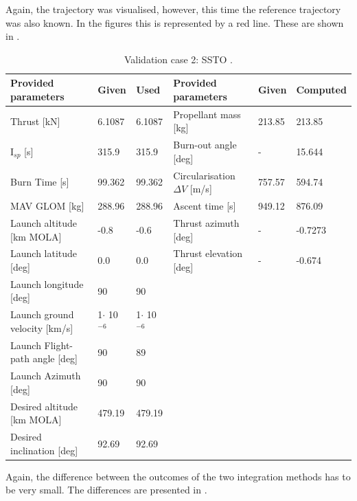 \noindent
Again, the trajectory was visualised, however, this time the reference trajectory was also known. In the figures this is represented by a red line. These are shown in .



\begin{table}[H]
\begin{center}
\caption{Validation case 2: \ac{SSTO} \cite{benito2016trajectory}.}
\label{tab:validationCaseBenito}
\begin{tabular}{|l|l|l||l||l|l|}
\hline 
\textbf{Provided parameters} & \textbf{Given} & \textbf{Used} & \textbf{Provided parameters} & \textbf{Given} & \textbf{Computed} \\ \hline \hline
Thrust [kN] & 6.1087 & 6.1087 & Propellant mass [kg] & 213.85 & 213.85 \\ \hline
I$_{sp}$ [s] & 315.9 & 315.9 & Burn-out angle [deg] & - & 15.644 \\ \hline
Burn Time [s] & 99.362 & 99.362 & Circularisation $\Delta V$ [m/s] & 757.57 & 594.74 \\ \hline
\ac{MAV} \ac{GLOM} [kg] & 288.96 & 288.96 & Ascent time [s] & 949.12 & 876.09 \\ \hline
Launch altitude [km \ac{MOLA}] & -0.8 & -0.6 & Thrust azimuth [deg] & - & -0.7273 \\ \hline
Launch latitude [deg] & 0.0 & 0.0 & Thrust elevation [deg] & - & -0.674 \\ \hline
Launch longitude [deg] & 90 & 90 & & & \\ \hline
Launch ground velocity [km/s] & 1$\cdot $ 10$^{-6}$ & 1$\cdot $ 10$^{-6}$ & & & \\ \hline
Launch Flight-path angle [deg] & 90 & 89 & & & \\ \hline
Launch Azimuth [deg] & 90 & 90 & & & \\ \hline
Desired altitude [km \ac{MOLA}] & 479.19 & 479.19 & & & \\ \hline
Desired inclination [deg] & 92.69 & 92.69 & & & \\ \hline




\end{tabular}
\end{center}
\end{table}


\noindent
Again, the difference between the outcomes of the two integration methods has to be very small. The differences are presented in .\\

